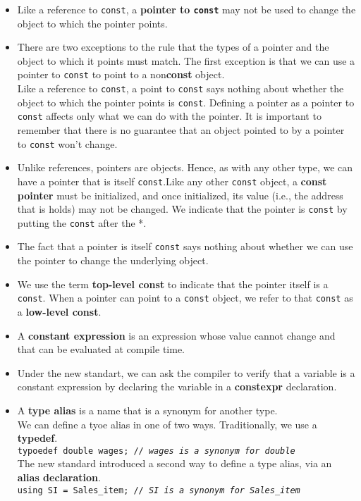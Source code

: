 \begin{itemize}
\item Like a reference to \texttt{const}, a \textbf{pointer to \texttt{const}} may not be used to change the object to which the pointer points.

\item There are two exceptions to the rule that the types of a pointer and the object to which it points must match. The first exception is that we can use a pointer to \texttt{const} to point to a non\textbf{const} object.\\Like a reference to \texttt{const}, a point to \texttt{const} says nothing about whether the object to which the pointer points is \texttt{const}. Defining a pointer as a pointer to \texttt{const} affects only what we can do with the pointer. It is important to remember that there is no guarantee that an object pointed to by a pointer to \texttt{const} won't change.

\item Unlike references, pointers are objects. Hence, as with any other type, we can have a pointer that is itself \texttt{const}.Like any other \texttt{const} object, a \textbf{const pointer} must be initialized, and once initialized, its value (i.e., the address that is holds) may not be changed. We indicate that the pointer is \texttt{const} by putting the \texttt{const} after the *.

\item The fact that a pointer is itself \texttt{const} says nothing about whether we can use the pointer to change the underlying object.

\item We use the term \textbf{top-level const} to indicate that the pointer itself is a \texttt{const}. When a pointer can point to a \texttt{const} object, we refer to that \texttt{const} as a \textbf{low-level const}.

\item A \textbf{constant expression} is an expression whose value cannot change and that can be evaluated at compile time.

\item Under the new standart, we can ask the compiler to verify that a variable is a constant expression by declaring the variable in a \textbf{constexpr} declaration.

\item A \textbf{type alias} is a name that is a synonym for another type.\\We can define a tyoe alias in one of two ways. Traditionally, we use a \textbf{typedef}.\\\hspace*{1em}\texttt{typoedef double wages; // \textit{wages is a synonym for double}}\\The new standard introduced a second way to define a type alias, via an \textbf{alias declaration}.\\\hspace*{1em}\texttt{using SI = Sales\_item; // \textit{SI is a synonym for Sales\_item}}


\end{itemize}
